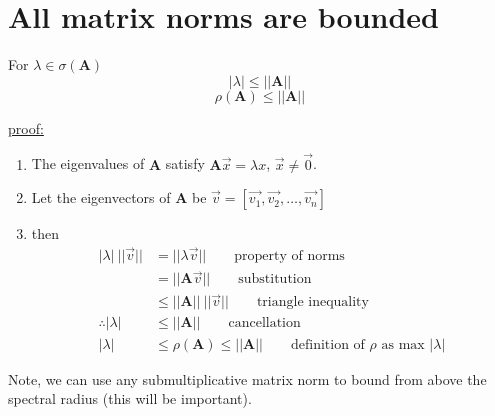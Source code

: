 \documentclass[12pt]{article}
\newcommand{\ve}[1]{\ensuremath{\mathbf{#1}}}
\begin{document}
\section*{All matrix norms are bounded}

For $\lambda \in \sigma(\ve{A})$ 
\[|\lambda | \leq ||\ve{A}||\]
\[\rho(\ve{A}) \leq ||\ve{A}||\]

\underline{proof:} 
\begin{enumerate}
\item The eigenvalues of $\ve{A}$ satisfy $\ve{A}\vec{x} = \lambda x$, $\vec{x} \neq \vec{0}$. 

\item Let the eigenvectors of $\ve{A}$ be $\vec{v} = [\vec{v_1}, \vec{v_2}, \dots, \vec{v_n}]$

\item then 
\begin{align}
|\lambda |\: ||\vec{v}|| &= ||\lambda \vec{v}|| 
\qquad \text{property of norms} \nonumber \\
%
                     &= ||\ve{A}\vec{v}|| 
                     \qquad \text{substitution} \nonumber \\
%
                     &\leq ||\ve{A}||\: ||\vec{v}||
                     \qquad \text{triangle inequality} \nonumber \\
%
\therefore |\lambda | &\leq ||\ve{A}|| 
\qquad \text{cancellation}\nonumber \\
%
|\lambda| &\leq \rho(\ve{A}) \leq ||\ve{A}|| 
\qquad \text{definition of }\rho\text{ as max }|\lambda | \nonumber
\end{align}
\end{enumerate}

Note, we can use any submultiplicative matrix norm to bound from above the spectral radius (this will be important).
\end{document}
